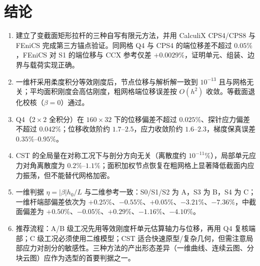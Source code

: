 \section{结论}

\begin{enumerate}[leftmargin=2em,itemsep=0.35em]
  \item 建立了变截面矩形拉杆的三种自写有限元方法，并用 CalculiX CPS4/CPS8 与 FEniCS 完成第三方锚点验证。同网格 Q4 与 CPS4 的端位移差不超过 $0.05\%$，FEniCS 对 S1 的端位移与 CCX 参考仅差 $+0.0029\%$，证明单元、组装、边界与载荷实现正确。
  \item 一维杆采用柔度积分等效刚度后，节点位移与解析解一致到 $10^{-13}$ 且与网格无关；平均面积刚度会高估刚度，粗网格端位移误差按 $O(h^2)$ 收敛。等截面退化校核（$\beta=0$）通过。
  \item Q4（$2\times2$ 全积分）在 $160\times32$ 下的位移偏差不超过 $0.025\%$、探针应力偏差不超过 $0.042\%$；位移收敛阶约 $1.7$–$2.5$，应力收敛阶约 $1.6$–$2.3$，梯度保真误差 $0.35\%$–$0.95\%$。
  \item CST 的全局量在对称工况下与剖分方向无关（离散度约 $10^{-11}\%$），局部单元应力对角离散度为 $0.2\%$–$1.1\%$；面积加权节点恢复在粗网格上显著降低截面内应力振荡，但不能替代网格加密。
  \item 一维判据 $\eta=|\beta|h_0/L$ 与二维参考一致：S0/S1/S2 为 A，S3 为 B，S4 为 C；一维杆端部偏差依次为 $+0.25\%$、$-0.55\%$、$+0.05\%$、$-3.21\%$、$-7.36\%$，中截面偏差为 $+0.50\%$、$-0.05\%$、$+0.29\%$、$-1.16\%$、$-4.10\%$。
  \item 推荐流程：A/B 级工况先用等效刚度杆单元估算轴力与位移，再用 Q4 复核端部；C 级工况必须使用二维模型；CST 适合快速原型/复杂几何，但需注意局部应力对剖分的敏感性。三种方法的产出形态差异（一维曲线、连续云图、分块云图）应作为选型的首要判据之一。
\end{enumerate}

